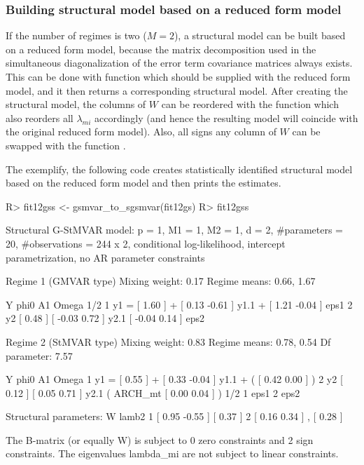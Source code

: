 \documentclass[nojss]{jss} %
\begin{document}
\subsubsection{Building structural model based on a reduced form model}
If the number of regimes is two ($M=2$), a structural model can be built based on a reduced form model, because the matrix decomposition used in the simultaneous diagonalization of the error term covariance matrices always exists. This can be done with function  which should be supplied with the reduced form model, and it then returns a corresponding structural model. After creating the structural model, the columns of $W$ can be reordered with the function  which also reorders all $\lambda_{mi}$ accordingly (and hence the resulting model will coincide with the original reduced form model). Also, all signs any column of $W$ can be swapped with the function .

The exemplify, the following code creates statistically identified structural model based on the reduced form model  and then prints the estimates.
%
\begin{Schunk}
\begin{Sinput}
R> fit12gss <- gsmvar_to_sgsmvar(fit12gs)
R> fit12gss
\end{Sinput}
\begin{Soutput}
Structural G-StMVAR model:
 p = 1, M1 = 1, M2 = 1, d = 2, #parameters = 20, #observations = 244 x 2,
 conditional log-likelihood, intercept parametrization, no AR parameter constraints 

Regime 1 (GMVAR type)
Mixing weight: 0.17 
Regime means: 0.66, 1.67

   Y     phi0          A1                  Omega         1/2     
1 y1 = [ 1.60 ] + [  0.13 -0.61 ] y1.1 + [  1.21 -0.04 ]     eps1
2 y2   [ 0.48 ]   [ -0.03  0.72 ] y2.1   [ -0.04  0.14 ]     eps2

Regime 2 (StMVAR type)
Mixing weight: 0.83 
Regime means: 0.78, 0.54
Df parameter:  7.57

   Y     phi0          A1                            Omega         
1 y1 = [ 0.55 ] + [  0.33 -0.04 ] y1.1 + (         [  0.42 0.00 ] )
2 y2   [ 0.12 ]   [  0.05  0.71 ] y2.1   ( ARCH_mt [  0.00 0.04 ] )
  1/2     
1     eps1
2     eps2

Structural parameters:
        W             lamb2  
1 [  0.95 -0.55 ]   [  0.37 ]
2 [  0.16  0.34 ] , [  0.28 ]

The B-matrix (or equally W) is subject to 0 zero constraints and 2 sign constraints.
The eigenvalues lambda_{mi} are not subject to linear constraints.
\end{Soutput}
\end{Schunk}
%
\end{document}
